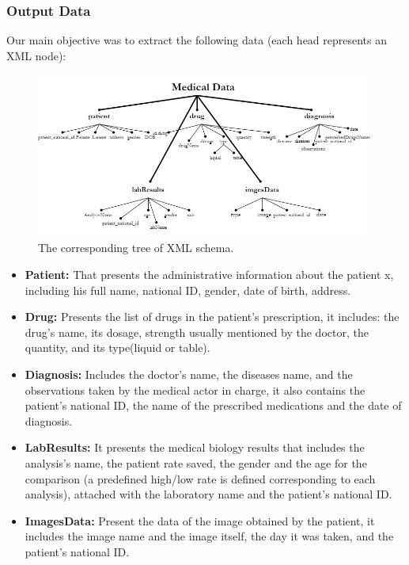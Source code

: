 \subsubsection*{Output Data}
Our main objective was to extract the following data (each head represents an XML node):
\begin{figure}[h!]
  \center
  \includegraphics[width=0.99\textwidth]{images/chapter3/tree.jpg}
  \caption{The corresponding tree of XML schema.}
  \label{fig:xmlschema}
\end{figure}
\begin{itemize}
\renewcommand{\labelitemi}{$\bullet$}
\item \textbf{Patient:} That presents the administrative information about the patient x, including his full name, national ID, gender, date of birth, address. 
\item \textbf{Drug:} Presents the list of drugs in the patient’s  prescription, it includes: the drug’s name, its dosage, strength usually mentioned by the doctor, the quantity, and its type(liquid or table).
\item \textbf{Diagnosis:} Includes the doctor's name, the diseases name, and the observations taken by the medical actor in charge, it also contains the patient’s national ID, the name of the prescribed medications and the date of diagnosis. 
\item \textbf{LabResults:} It presents the medical biology results that includes the analysis’s name, the patient rate saved, the gender and the age for the comparison (a predefined high/low rate is defined corresponding to each analysis), attached with the laboratory name and the patient's national ID.
\item \textbf{ImagesData:} Present the data of the image obtained by the patient, it includes the image name and the image itself, the day it was taken, and the patient's national ID.
\end{itemize}

